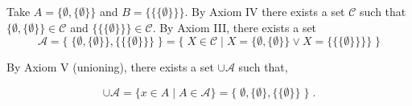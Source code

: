 \documentclass[a4paper]{article}
\begin{document}
\begin{enumerate}
Take $A = \{\emptyset , \{\emptyset\} \}$ and $B = \{\{\{\emptyset \}\}\}$. By Axiom IV there exists a set $\mathcal{C}$ such that $\{\emptyset, \{\emptyset\} \} \in \mathcal{C}$ and $\{\{\{\emptyset \}\}\} \in \mathcal{C}$. By Axiom III, there exists a set
$$
\mathcal{A} = \{\; \{\emptyset, \{\emptyset\} \}, \{\{\{\emptyset\}\}\} \; \} = \{ \; X \in \mathcal{C} \mid X = \{\emptyset, \{\emptyset\} \} \lor X = \{\{\{\emptyset\}\}\} \} \; \}
$$

By Axiom V (unioning), there exists a set $\cup \mathcal{A}$ such that,

$$
\cup \mathcal{A}
= \{x \in A \mid A \in \mathcal{A} \}
= \{\;\emptyset, \{\emptyset \}, \{\{\emptyset \}\} \;\} \;.
$$



	
\end{enumerate}
\end{document}
